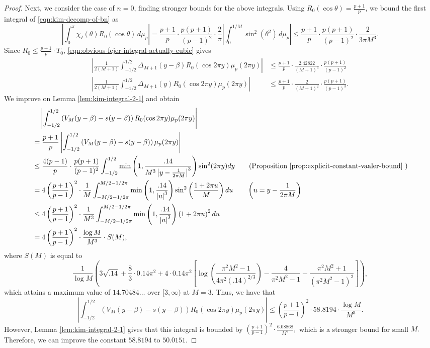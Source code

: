 \documentclass[11pt,letterpaper,reqno]{amsart}
\theoremstyle{definition}
\numberwithin{equation}{section}
\numberwithin{figure}{section}
\numberwithin{table}{section}
\begin{document}
\begin{proof}
    Next, we consider the case of $n=0$, finding stronger bounds for the above integrals. Using $R_0(\cos \theta) = \frac{p + 1}{p}$, we bound the first integral of \eqref{eqn:kim-decomp-of-bn} as
    $$\left| \int_0^\pi \chi_I(\theta) R_0(\cos \theta) \,d\mu_p \right| = \frac{p + 1}{p} \cdot \frac{p(p + 1)}{(p - 1)^2} \cdot \frac{2}{\pi}\left| \int_0^{1/M}  \sin^2(\theta^2) \,d\mu_p \right| \leq \frac{p + 1}{p} \cdot \frac{p(p + 1)}{(p - 1)^2} \cdot \frac{2}{3\pi M^3}.$$
Since $R_0 \leq \frac{p + 1}{p} \cdot T_0$, \eqref{eqn:obvious-fejer-integral-actually-cubic} gives
\begin{align*}
    \left| \frac{1}{2(M + 1)} \int_{-1/2}^{1/2}
 \Delta_{M+1}(y - \beta) R_0 ( \cos 2 \pi y ) \mu_p(2\pi y) \right| &\leq \frac{p + 1}{p} \cdot \frac{2.42822}{(M + 1)^3} \cdot \frac{p(p + 1)}{(p - 1)^2}\\
 \left| \frac{1}{2(M + 1)} \int_{-1/2}^{1/2}
 \Delta_{M+1}(y) R_0 ( \cos 2 \pi y ) \mu_p(2\pi y) \right| &\leq \frac{p + 1}{p} \cdot \frac{2}{(M + 1)^2} \cdot \frac{p(p + 1)}{(p - 1)^3}.
\end{align*}
We improve on Lemma \ref{lem:kim-integral-2-1} and obtain
\begin{align*}
    &\quad \left| \int_{-1/2}^{1/2}
 \left( V_M(y - \beta ) - s(y - \beta) \right) R_0 ( \cos 2 \pi y ) \mu_p(2\pi y) \right|\\
    &= \frac{p + 1}{p}\left| \int_{-1/2}^{1/2}
 \left( V_M(y - \beta ) - s(y - \beta) \right) \mu_p(2\pi y) \right| \\
 &\leq \frac{4(p - 1)}{p} \cdot \frac{p(p + 1)}{(p - 1)^2} \int_{-1/2}^{1/2}
  \min \left( 1, \frac{.14}{M^3 \left|y - \frac{1}{2\pi M} \right|^3} \right) \sin^2(2\pi y) dy \qquad \text{(Proposition \ref{prop:explicit-constant-vaaler-bound} )}\\
  & = 4 \left( \frac{p + 1}{p - 1} \right)^2 \cdot \frac{1}{M} \int_{-M/2 - 1/2\pi}^{M/2 - 1/2\pi}
  \min \left( 1, \frac{.14}{\left|u \right|^3} \right) \sin^2\left( \frac{1 + 2\pi u}{M}  \right) du \qquad \left( u = y - \frac{1}{2\pi M} \right)\\
  & \leq 4 \left( \frac{p + 1}{p - 1} \right)^2 \cdot \frac{1}{M^3} \int_{-M/2 - 1/2\pi}^{M/2 - 1/2\pi}
  \min \left( 1, \frac{.14}{\left|u \right|^3} \right) \left( 1 + 2\pi u  \right)^2 du\\
  & = 4 \left( \frac{p + 1}{p - 1} \right)^2 \cdot \frac{\log M}{M^3} \cdot S(M),
\end{align*}
where $S(M)$ is equal to
$$\frac{1}{\log M} \left( 3 \sqrt{.14} + \frac{8}{3} \cdot 0.14 \pi^2 + 4 \cdot 0.14 \pi^2 \left[ \log\left( \frac{\pi^2 M^2 - 1}{4\pi^2 (.14)^{2/3}} \right) - \frac{4}{\pi^2 M^2 - 1} - \frac{\pi^2 M^2 + 1}{(\pi^2 M^2 - 1)^2} \right] \right),
$$
which attains a maximum value of $14.70484\dots$ over $[3, \infty)$ at $M = 3.$ Thus, we have that
$$\left| \int_{-1/2}^{1/2}
 \left( V_M(y - \beta ) - s(y - \beta) \right) R_0 ( \cos 2 \pi y ) \mu_p(2\pi y) \right| \leq \left( \frac{p + 1}{p - 1} \right)^2 \cdot 58.8194 \cdot \frac{\log  M}{M^3}.$$
 However, Lemma \ref{lem:kim-integral-2-1} gives that this integral is bounded by $\left( \frac{p + 1}{p - 1}  \right)^2 \cdot  \frac{6.08868}{M^2},$ which is a stronger bound for small $M.$ Therefore, we can improve the constant $58.8194 $ to $50.0151.$


\end{proof}
\end{document}

